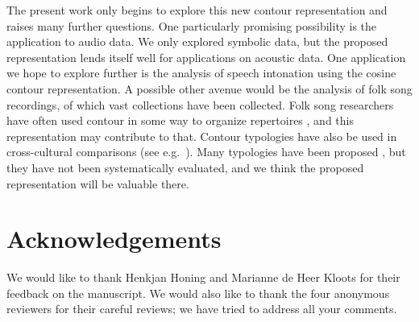 \documentclass{article}
\begin{document}
The present work only begins to explore this new contour representation and raises many further questions.
One particularly promising possibility is the application to audio data.
We only explored symbolic data, but the proposed representation lends itself well for applications on acoustic data.
One application we hope to explore further is the analysis of speech intonation using the cosine contour representation.
A possible other avenue would be the analysis of folk song recordings, of which vast collections have been collected.
Folk song researchers have often used contour in some way to organize repertoires \cite{Adams1976}, and this representation may contribute to that.
Contour typologies have also be used in cross-cultural comparisons (see e.g.~\cite{Savage2015}).
Many typologies have been proposed \cite{Adams1976,Huron1996,Kelkar2018,Savage2012}, but they have not been systematically evaluated, and we think the proposed representation will be valuable there.


\section{Acknowledgements}


We would like to thank Henkjan Honing and Marianne de Heer Kloots for their feedback on the manuscript.
We would also like to thank the four anonymous reviewers for their careful reviews; we have tried to address all your comments.



\end{document}
